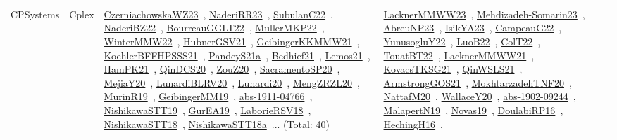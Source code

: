 {\begin{longtable}{lp{3cm}>{\raggedright\arraybackslash}p{6cm}>{\raggedright\arraybackslash}p{6cm}>{\raggedright\arraybackslash}p{8cm}}
CPSystems & Cplex & \href{works/CzerniachowskaWZ23.pdf}{CzerniachowskaWZ23}~\cite{CzerniachowskaWZ23}, \href{works/NaderiRR23.pdf}{NaderiRR23}~\cite{NaderiRR23}, \href{works/SubulanC22.pdf}{SubulanC22}~\cite{SubulanC22}, \href{works/NaderiBZ22.pdf}{NaderiBZ22}~\cite{NaderiBZ22}, \href{works/BourreauGGLT22.pdf}{BourreauGGLT22}~\cite{BourreauGGLT22}, \href{works/MullerMKP22.pdf}{MullerMKP22}~\cite{MullerMKP22}, \href{works/WinterMMW22.pdf}{WinterMMW22}~\cite{WinterMMW22}, \href{works/HubnerGSV21.pdf}{HubnerGSV21}~\cite{HubnerGSV21}, \href{works/GeibingerKKMMW21.pdf}{GeibingerKKMMW21}~\cite{GeibingerKKMMW21}, \href{works/KoehlerBFFHPSSS21.pdf}{KoehlerBFFHPSSS21}~\cite{KoehlerBFFHPSSS21}, \href{works/PandeyS21a.pdf}{PandeyS21a}~\cite{PandeyS21a}, \href{works/Bedhief21.pdf}{Bedhief21}~\cite{Bedhief21}, \href{works/Lemos21.pdf}{Lemos21}~\cite{Lemos21}, \href{works/HamPK21.pdf}{HamPK21}~\cite{HamPK21}, \href{works/QinDCS20.pdf}{QinDCS20}~\cite{QinDCS20}, \href{works/ZouZ20.pdf}{ZouZ20}~\cite{ZouZ20}, \href{works/SacramentoSP20.pdf}{SacramentoSP20}~\cite{SacramentoSP20}, \href{works/MejiaY20.pdf}{MejiaY20}~\cite{MejiaY20}, \href{works/LunardiBLRV20.pdf}{LunardiBLRV20}~\cite{LunardiBLRV20}, \href{works/Lunardi20.pdf}{Lunardi20}~\cite{Lunardi20}, \href{works/MengZRZL20.pdf}{MengZRZL20}~\cite{MengZRZL20}, \href{works/MurinR19.pdf}{MurinR19}~\cite{MurinR19}, \href{works/GeibingerMM19.pdf}{GeibingerMM19}~\cite{GeibingerMM19}, \href{works/abs-1911-04766.pdf}{abs-1911-04766}~\cite{abs-1911-04766}, \href{works/NishikawaSTT19.pdf}{NishikawaSTT19}~\cite{NishikawaSTT19}, \href{works/GurEA19.pdf}{GurEA19}~\cite{GurEA19}, \href{works/LaborieRSV18.pdf}{LaborieRSV18}~\cite{LaborieRSV18}, \href{works/NishikawaSTT18.pdf}{NishikawaSTT18}~\cite{NishikawaSTT18}, \href{works/NishikawaSTT18a.pdf}{NishikawaSTT18a}~\cite{NishikawaSTT18a}... (Total: 40) & \href{works/LacknerMMWW23.pdf}{LacknerMMWW23}~\cite{LacknerMMWW23}, \href{works/Mehdizadeh-Somarin23.pdf}{Mehdizadeh-Somarin23}~\cite{Mehdizadeh-Somarin23}, \href{works/AbreuNP23.pdf}{AbreuNP23}~\cite{AbreuNP23}, \href{works/IsikYA23.pdf}{IsikYA23}~\cite{IsikYA23}, \href{works/CampeauG22.pdf}{CampeauG22}~\cite{CampeauG22}, \href{works/YunusogluY22.pdf}{YunusogluY22}~\cite{YunusogluY22}, \href{works/LuoB22.pdf}{LuoB22}~\cite{LuoB22}, \href{works/ColT22.pdf}{ColT22}~\cite{ColT22}, \href{works/TouatBT22.pdf}{TouatBT22}~\cite{TouatBT22}, \href{works/LacknerMMWW21.pdf}{LacknerMMWW21}~\cite{LacknerMMWW21}, \href{works/KovacsTKSG21.pdf}{KovacsTKSG21}~\cite{KovacsTKSG21}, \href{works/QinWSLS21.pdf}{QinWSLS21}~\cite{QinWSLS21}, \href{works/ArmstrongGOS21.pdf}{ArmstrongGOS21}~\cite{ArmstrongGOS21}, \href{works/MokhtarzadehTNF20.pdf}{MokhtarzadehTNF20}~\cite{MokhtarzadehTNF20}, \href{works/NattafM20.pdf}{NattafM20}~\cite{NattafM20}, \href{works/WallaceY20.pdf}{WallaceY20}~\cite{WallaceY20}, \href{works/abs-1902-09244.pdf}{abs-1902-09244}~\cite{abs-1902-09244}, \href{works/MalapertN19.pdf}{MalapertN19}~\cite{MalapertN19}, \href{works/Novas19.pdf}{Novas19}~\cite{Novas19}, \href{works/DoulabiRP16.pdf}{DoulabiRP16}~\cite{DoulabiRP16}, \href{works/HechingH16.pdf}{HechingH16}~\cite{HechingH16}, 
\end{longtable}}
